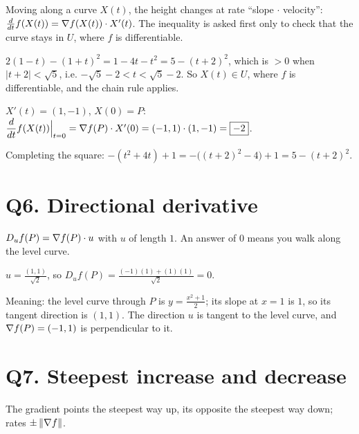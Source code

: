 \begin{idea}
Moving along a curve $X(t)$, the height changes at rate ``slope $\cdot$ velocity'':
$\frac{d}{dt}f(X(t))=\nabla f(X(t))\cdot X'(t)$. The inequality is asked first only to check that the
curve stays in $U$, where $f$ is differentiable.
\end{idea}



\begin{writethis}
$2(1-t)-(1+t)^2=1-4t-t^2=5-(t+2)^2$, which is $>0$ when $|t+2|<\sqrt5$, i.e. $-\sqrt5-2<t<\sqrt5-2$.
So $X(t)\in U$, where $f$ is differentiable, and the chain rule applies.

$X'(t)=(1,-1)$, $X(0)=P$: \quad $\dfrac{d}{dt}f(X(t))\Big|_{t=0}=\nabla f(P)\cdot X'(0)=(-1,1)\cdot(1,-1)=\boxed{-2}$.
\end{writethis}

\begin{watch}\watchout Completing the square: $-(t^2+4t)+1=-\big((t+2)^2-4\big)+1=5-(t+2)^2$.\end{watch}

\section{Q6. Directional derivative}

\begin{idea}
$D_uf(P)=\nabla f(P)\cdot u$ with $u$ of length $1$. An answer of $0$ means you walk along the level curve.
\end{idea}

\begin{writethis}
$u=\frac{(1,1)}{\sqrt2}$, so $D_uf(P)=\frac{(-1)(1)+(1)(1)}{\sqrt2}=\boxed{0}$.

Meaning: the level curve through $P$ is $y=\frac{x^2+1}2$; its slope at $x=1$ is $1$, so its tangent
direction is $(1,1)$. The direction $u$ is tangent to the level curve, and $\nabla f(P)=(-1,1)$ is
perpendicular to it.
\end{writethis}

\section{Q7. Steepest increase and decrease}

\begin{idea}
The gradient points the steepest way up, its opposite the steepest way down; rates $\pm\left\lVert \nabla f\right\rVert$.
\end{idea}

